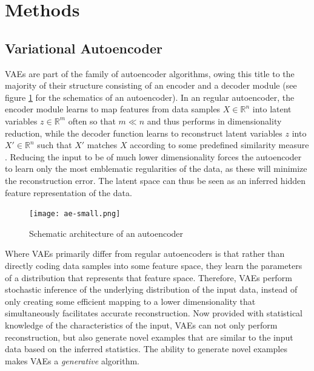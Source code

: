 \documentclass[twocolumn]{article}
\begin{document}
\hypertarget{methods}{%
\section{Methods}\label{methods}}

\hypertarget{vae}{%
\subsection{Variational Autoencoder}\label{vae}}

VAEs are part of the family of autoencoder algorithms, owing this title
to the majority of their structure consisting of an encoder and a
decoder module \citep{doersch2016tutorial} (see figure \ref{fig:ae} for the
schematics of an autoencoder). In an regular autoencoder, the encoder
module learns to map features from data samples \(X \in \mathbb{R}^{n}\)
into latent variables \(z \in \mathbb{R}^{m}\) often so that \(m \ll n\)
and thus performs in dimensionality reduction, while the decoder
function learns to reconstruct latent variables \(z\) into
\(X' \in \mathbb{R}^{n}\) such that \(X'\) matches \(X\) according to
some predefined similarity measure \citep{liou2014autoencoder}. Reducing
the input to be of much lower dimensionality forces the autoencoder to
learn only the most emblematic regularities of the data, as these will
minimize the reconstruction error. The latent space can thus be seen as
an inferred hidden feature representation of the data.

\begin{figure}
\centering
\texttt{[image: ae-small.png]}
\caption{Schematic architecture of an autoencoder}
\label{fig:ae}
\end{figure}

Where VAEs primarily differ from regular autoencoders is that rather
than directly coding data samples into some feature space, they learn
the parameters of a distribution that represents that feature space.
Therefore, VAEs perform stochastic inference of the underlying
distribution of the input data, instead of only creating some efficient
mapping to a lower dimensionality that simultaneously facilitates
accurate reconstruction. Now provided with statistical knowledge of the
characteristics of the input, VAEs can not only perform reconstruction,
but also generate novel examples that are similar to the input data
based on the inferred statistics. The ability to generate novel examples
makes VAEs a \emph{generative} algorithm.
\end{document}

